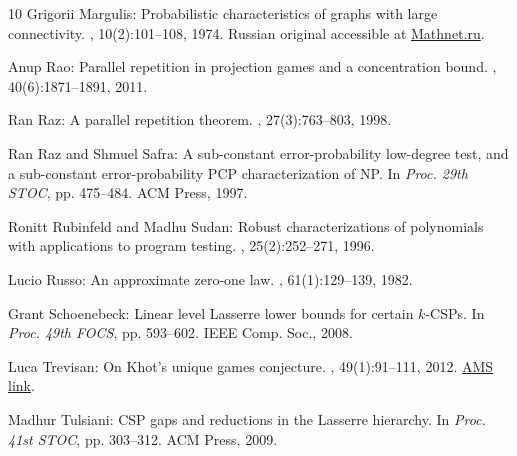 \documentclass[11pt]{article}
\numberwithin{equation}{section}
\theoremstyle{definition}
\theoremstyle{plain}
\begin{document}
\begin{thebibliography}{10}
{\sc Grigorii Margulis}: Probabilistic characteristics of graphs with large
  connectivity.
, 10(2):101--108, 1974.
\newblock Russian original accessible at
  \href{https://www.mathnet.ru/php/archive.phtml?wshow=paper&jrnid=ppi&paperid=1034&option\_lang=eng}{Mathnet.ru}.

{\sc Anup Rao}: Parallel repetition in projection games and a concentration
  bound.
, 40(6):1871--1891, 2011.
\newblock [\epfmtdoi{10.1137/080734042}]

{\sc Ran Raz}: A parallel repetition theorem.
, 27(3):763--803, 1998.
\newblock [\epfmtdoi{10.1137/S0097539795280895}]

{\sc Ran Raz and Shmuel Safra}: A sub-constant error-probability low-degree
  test, and a sub-constant error-probability {PCP} characterization of {NP}.
\newblock In {\em Proc. 29th STOC}, pp. 475--484. ACM Press, 1997.
\newblock [\epfmtdoi{10.1145/258533.258641}]

{\sc Ronitt Rubinfeld and Madhu Sudan}: Robust characterizations of polynomials
  with applications to program testing.
, 25(2):252--271, 1996.
\newblock [\epfmtdoi{10.1137/S0097539793255151}]

{\sc Lucio Russo}: An approximate zero-one law.
,
  61(1):129--139, 1982.
\newblock [\epfmtdoi{10.1007/BF00537230}]

{\sc Grant Schoenebeck}: Linear level {L}asserre lower bounds for certain
  $k$-{CSPs}.
\newblock In {\em Proc. 49th FOCS}, pp. 593--602. IEEE Comp. Soc., 2008.

{\sc Luca Trevisan}: On {Khot}'s unique games conjecture.
, 49(1):91--111, 2012.
\newblock
  \href{https://www.ams.org/journals/bull/2012-49-01/S0273-0979-2011-01361-1/S0273-0979-2011-01361-1.pdf}{AMS
  link}.

{\sc Madhur Tulsiani}: {CSP} gaps and reductions in the {L}asserre hierarchy.
\newblock In {\em Proc. 41st STOC}, pp. 303--312. ACM Press, 2009.
\newblock [\epfmtdoi{10.1145/1536414.1536457}]

\end{thebibliography}
\end{document}
